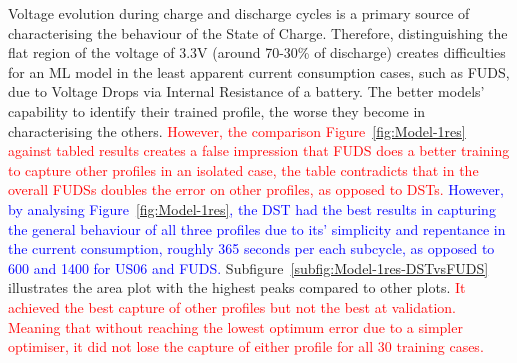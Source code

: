 %
%
%
%
%
%
%
%
%
%
%
%
% 
%
%
Voltage evolution during charge and discharge cycles is a primary source of characterising the behaviour of the State of Charge.
Therefore, distinguishing the flat region of the voltage of 3.3V (around 70-30\% of discharge) creates difficulties for an ML model in the least apparent current consumption cases, such as FUDS, due to Voltage Drops via Internal Resistance of a battery.
The better models' capability to identify their trained profile, the worse they become in characterising the others.
%
\textcolor{red}{However, the comparison Figure~\ref{fig:Model-1res} against tabled results creates a false impression that FUDS does a better training to capture other profiles in an isolated case, the table contradicts that in the overall FUDSs doubles the error on other profiles, as opposed to DSTs.}
\textcolor{blue}{However, by analysing Figure~\ref{fig:Model-1res}, the DST had the best results in capturing the general behaviour of all three profiles due to its' simplicity and repentance in the current consumption, roughly 365 seconds per each subcycle, as opposed to 600 and 1400 for US06 and FUDS.}
Subfigure~\ref{subfig:Model-1res-DSTvsFUDS} illustrates the area plot with the highest peaks compared to other plots.
\textcolor{red}{It achieved the best capture of other profiles but not the best at validation.
Meaning that without reaching the lowest optimum error due to a simpler optimiser, it did not lose the capture of either profile for all 30 training cases.}
